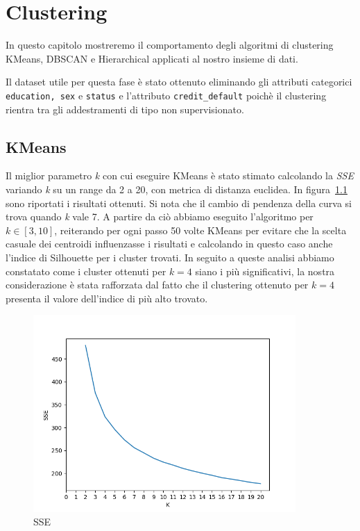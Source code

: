 \chapter{Clustering}
In questo capitolo mostreremo il comportamento 
degli algoritmi di clustering KMeans, DBSCAN 
e Hierarchical applicati al nostro insieme di 
dati.

Il dataset utile per questa fase \`e stato
ottenuto eliminando gli attributi categorici
\texttt{education, sex} e \texttt{status} 
e l'attributo \texttt{credit\_default} 
poich\`e il clustering rientra tra 
gli addestramenti di tipo non supervisionato.

\section{KMeans}

Il miglior parametro \textit{k} con cui eseguire 
KMeans \`e stato stimato calcolando la 
\textit{SSE} variando \textit{k} su un range da 
2 a 20, con metrica di distanza euclidea. 
In figura~\ref{fig:best_k} sono riportati 
i risultati ottenuti. Si nota che il cambio di
pendenza della curva si trova quando \textit{k}
vale 7. A partire da ci\`o abbiamo eseguito l'algoritmo
per $k\in[3,10]$, reiterando per ogni passo 50 volte
KMeans per evitare che la scelta casuale dei centroidi
influenzasse i risultati e calcolando in questo caso
anche l'indice di Silhouette per i cluster trovati.
In seguito a queste analisi abbiamo constatato come
i cluster ottenuti per $k=4$ siano i pi\`u significativi,
la nostra considerazione \`e stata rafforzata dal fatto
che il clustering ottenuto per $k=4$ presenta il valore
dell'indice di \sil pi\`u alto trovato.

\begin{figure}[H]
	\centering
	\includegraphics[width=10cm]{img/best_k.png}
	\caption[LOF entry]{SSE}
	\label{fig:best_k}
\end{figure} 

